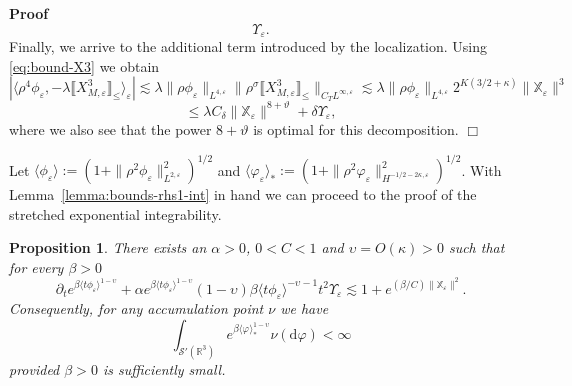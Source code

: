 \documentclass[a4paper,11pt]{article}
\newcommand{\assign}{:=}
\newcommand{\mathd}{\mathrm{d}}
\newenvironment{proof}{\noindent\textbf{Proof\ }}{\hspace*{\fill}$\Box$\medskip}
\newtheorem{proposition}[theorem]{Proposition}
\numberwithin{equation}{section}
\begin{document}
\begin{proof}
\[     \Upsilon_{\varepsilon} . \]
  Finally, we arrive to the additional term introduced by the localization. Using \eqref{eq:bound-X3} we obtain
  \[ | \langle \rho^4 \phi_{\varepsilon}, - \lambda \llbracket X_{M,
     \varepsilon}^3 \rrbracket_{\leqslant} \rangle_{\varepsilon} | \lesssim
     \lambda \| \rho \phi_{\varepsilon} \|_{L^{4, \varepsilon}} \|
     \rho^{\sigma} \llbracket X_{M, \varepsilon}^3 \rrbracket_{\leqslant}
     \|_{C_T L^{\infty, \varepsilon}} \lesssim \lambda \| \rho
     \phi_{\varepsilon} \|_{L^{4, \varepsilon}} 2^{K (3 / 2 + \kappa)} \|
     \mathbb{X}_{\varepsilon} \|^3 \]
  \[ \leqslant \lambda C_{\delta}^{} \| \mathbb{X}_{\varepsilon} \|^{8 +
     \vartheta} + \delta \Upsilon_{\varepsilon}, \]
  where we also see that the power $8+\vartheta$ is optimal for this decomposition.
\end{proof}

Let $\langle \phi_{\varepsilon} \rangle \assign (1 + \| \rho^2
\phi_{\varepsilon} \|_{L^{2, \varepsilon}}^2)^{1 / 2}$ and $\langle
\varphi_{\varepsilon} \rangle_{\ast} \assign (1 + \| \rho^2
\varphi_{\varepsilon} \|_{H^{- 1 / 2 - 2 \kappa, \varepsilon}}^2)^{1 / 2}$.
With Lemma~\ref{lemma:bounds-rhs1-int} in hand we can proceed to the proof of the stretched exponential
integrability.



\begin{proposition}
  \label{lemma:int-bound}
  There exists an $\alpha
  > 0$, $0 < C < 1$ and  $\upsilon=O(\kappa)>0$  such that for every $\beta>0$ 
  \[ \partial_t e^{\beta \langle t \phi_{\varepsilon} \rangle^{1 - \upsilon}}
     + \alpha e^{\beta \langle t \phi_{\varepsilon} \rangle^{1 - \upsilon}} (1-\upsilon)\beta
     \langle t \phi_{\varepsilon} \rangle^{- \upsilon - 1} t^2
     \Upsilon_{\varepsilon} \lesssim 1 + e^{(\beta / C) \|
     \mathbb{X}_{\varepsilon} \|^2}. \]
 Consequently, for any accumulation point $\nu$ we have
  \[ \int_{\mathcal{S}'(\mathbb{R}^{3})} e^{\beta \langle \varphi_{} \rangle_{\ast}^{1 - \upsilon}} \nu
     (\mathd \varphi) < \infty \]
provided  $\beta>0$ is sufficiently small.
\end{proposition}
\end{document}
